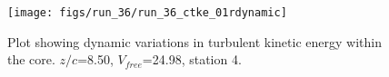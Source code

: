 \begin{figure}[H]
\centering
\texttt{[image: figs/run\_36/run\_36\_ctke\_01rdynamic]}
\caption{Plot showing dynamic variations in turbulent kinetic energy within the core. $z/c$=8.50, $V_{free}$=24.98, station 4.}
\label{fig:run_36_ctke_01rdynamic}
\end{figure}


